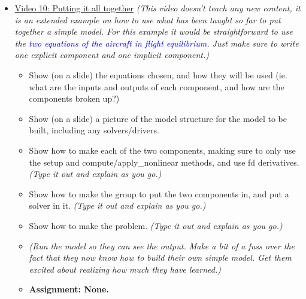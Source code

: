 \documentclass[12pt, letterpaper]{article}
\begin{document}
\begin{itemize}
	\item \underline{Video 10: Putting it all together} \textit{(This video doesn’t teach any new content, it is an extended example on how to use what has been taught so far to put together a simple model. For this example it would be straightforward to use the \textcolor{blue}{two equations of the aircraft in flight equilibrium}. Just make sure to write one explicit component and one implicit component.)}
		\begin{itemize}
			\item Show (on a slide) the equations chosen, and how they will be used (ie. what are the inputs and outputs of each component, and how are the components broken up?)
			\item Show (on a slide) a picture of the model structure for the model to be built, including any solvers/drivers.
			\item Show how to make each of the two components, making sure to only use the setup and compute/apply\_nonlinear methods, and use fd derivatives. \textit{(Type it out and explain as you go.)}
			\item Show how to make the group to put the two components in, and put a solver in it. \textit{(Type it out and explain as you go.)}
			\item Show how to make the problem. \textit{(Type it out and explain as you go.)}
			\item \textit{(Run the model so they can see the output. Make a bit of a fuss over the fact that they now know how to build their own simple model. Get them excited about realizing how much they have learned.)}
			\item \textbf{Assignment: None.} 
		\end{itemize}
		

\end{itemize}
\end{document}
